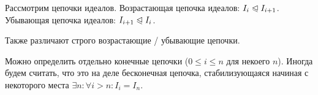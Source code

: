 \documentclass[a4paper]{report}
\begin{document}
    Рассмотрим цепочки идеалов.
    Возрастающая цепочка идеалов: $I_i \trianglelefteqslant I_{i + 1}$.
    Убывающая цепочка идеалов: $I_{i + 1} \trianglelefteqslant I_i$.

    Также различают строго возрастающие / убывающие цепочки.

    Можно определить отдельно конечные цепочки ($0 \le i \le n$ для некоего $n$).
    Иногда будем считать, что это на деле бесконечная цепочка, стабилизующаяся начиная с некоторого места $\exists n: \forall i > n: I_i = I_n$.

\end{document}
